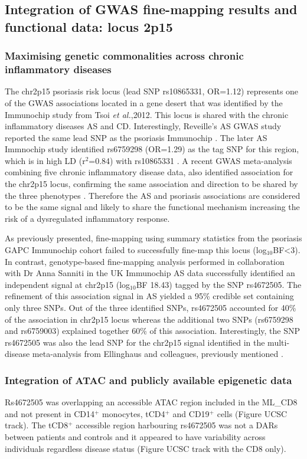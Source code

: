 \subsection{Integration of GWAS fine-mapping results and functional data: locus 2p15}
\subsubsection{Maximising genetic commonalities across chronic inflammatory diseases}
The chr2p15 psoriasis risk locus (lead SNP rs10865331, OR=1.12) represents one of the GWAS associations located in a gene desert that was identified by the Immunochip study from Tsoi \textit{et al.},2012. This locus is shared with the chronic inflammatory diseases AS and CD. Interestingly, Reveille's AS GWAS study reported the same lead SNP as the psoriasis Immunochip \parencite{Reveille2010}. The later AS Immnochip study identified rs6759298 (OR=1.29) as the tag SNP for this region, which is in high LD (r$^2$=0.84) with rs10865331 \parencite{Cortes2012}. A recent GWAS meta-analysis combining five chronic inflammatory disease data, also identified association for the chr2p15 locus, confirming the same association and direction to be shared by the three phenotypes \parencite{Ellinghaus2016}. Therefore the AS and psoriasis associations are considered to be the same signal and likely to share the functional mechanism increasing the risk of a dysregulated inflammatory response.

As previously presented, fine-mapping using summary statistics from the psoriasis GAPC Immunochip cohort failed to successfully fine-map this locus (log$_10$BF<3). In contrast, genotype-based fine-mapping analysis performed in collaboration with Dr Anna Sanniti in the UK Immunochip AS data successfully identified an independent signal at chr2p15 (log$_10$BF 18.43) tagged by the SNP rs4672505. The refinement of this association signal in AS yielded a 95\% credible set containing only three SNPs. Out of the three identified SNPs, rs4672505 accounted for 40\% of the association in chr2p15 locus whereas the additional two SNPs (rs6759298 and rs6759003) explained together 60\% of this association. Interestingly, the SNP rs4672505 was also the lead SNP for the chr2p15 signal identified in the multi-disease meta-analysis from Ellinghaus and colleagues, previously mentioned \parencite{Ellinghaus2016}.

\subsubsection{Integration of ATAC and publicly available epigenetic data}
Rs4672505 was overlapping an accessible ATAC region included in the ML\_CD8 and not present in CD14$^+$ monocytes, tCD4$^+$ and CD19$^+$ cells (Figure UCSC track). The tCD8$^+$ accessible region harbouring rs4672505 was not a DARs between patients and controls and it appeared to have variability across individuals regardless disease status (Figure UCSC track with the CD8 only). 


